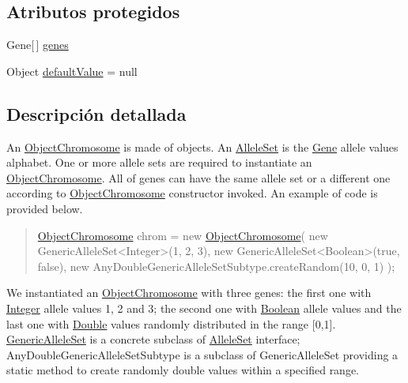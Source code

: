 \subsection*{Atributos protegidos}
\begin{DoxyCompactItemize}
\item 
Gene\mbox{[}$\,$\mbox{]} \hyperlink{classjenes_1_1chromosome_1_1_object_chromosome_a33bb9e1cc526fe8e4be0417bbd05a127}{genes}
\item 
Object \hyperlink{classjenes_1_1chromosome_1_1_object_chromosome_af5e2ac0b5272d948ec566f824baa3411}{default\-Value} = null
\end{DoxyCompactItemize}


\subsection{Descripción detallada}
An \hyperlink{classjenes_1_1chromosome_1_1_object_chromosome}{Object\-Chromosome} is made of objects. An \hyperlink{}{Allele\-Set} is the \hyperlink{}{Gene} allele values alphabet. One or more allele sets are required to instantiate an \hyperlink{classjenes_1_1chromosome_1_1_object_chromosome}{Object\-Chromosome}. All of genes can have the same allele set or a different one according to \hyperlink{classjenes_1_1chromosome_1_1_object_chromosome}{Object\-Chromosome} constructor invoked. An example of code is provided below. 

\begin{quotation}

\begin{DoxyPre}
\hyperlink{classjenes_1_1chromosome_1_1_object_chromosome}{ObjectChromosome} chrom = new \hyperlink{classjenes_1_1chromosome_1_1_object_chromosome}{ObjectChromosome}(
        new GenericAlleleSet<Integer>(1, 2, 3),
    new GenericAlleleSet<Boolean>(true, false),
        new AnyDoubleGenericAlleleSetSubtype.createRandom(10, 0, 1)  );
\end{DoxyPre}
\end{quotation}


We instantiated an \hyperlink{classjenes_1_1chromosome_1_1_object_chromosome}{Object\-Chromosome} with three genes\-: the first one with \hyperlink{}{Integer} allele values 1, 2 and 3; the second one with \hyperlink{}{Boolean} allele values and the last one with \hyperlink{}{Double} values randomly distributed in the range \mbox{[}0,1\mbox{]}. \hyperlink{}{Generic\-Allele\-Set} is a concrete subclass of \hyperlink{}{Allele\-Set} interface; Any\-Double\-Generic\-Allele\-Set\-Subtype is a subclass of Generic\-Allele\-Set providing a static method to create randomly double values within a specified range.

